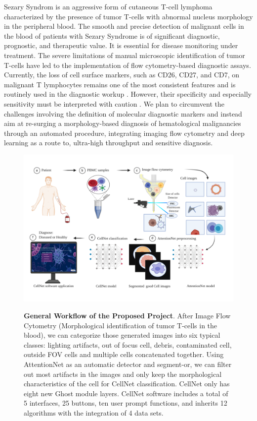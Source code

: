 Sezary Syndrom is an aggressive form of cutaneous T-cell lymphoma characterized by the presence of tumor T-cells with abnormal nucleus morphology in the peripheral blood. The smooth and precise detection of malignant cells in the blood of patients with Sezary Syndrome is of significant diagnostic, prognostic, and therapeutic value. It is essential for disease monitoring under treatment\cite{6}\cite{7}. The severe limitations of manual microscopic identification of tumor T-cells have led to the implementation of flow cytometry-based diagnostic assays. Currently, the loss of cell surface markers, such as CD26, CD27, and CD7, on malignant T lymphocytes remains one of the most consistent features and is routinely used in the diagnostic workup \cite{12}. However, their specificity and especially sensitivity must be interpreted with caution \cite{11}. We plan to circumvent the challenges involving the definition of molecular diagnostic markers and instead aim at re-surging a morphology-based diagnosis of hematological malignancies through an automated procedure, integrating imaging flow cytometry and deep learning as a route to, ultra-high throughput and sensitive diagnosis.
 
\label{sub:figures}
\begin{figure}[ht]
	\begin{center}
	\includegraphics[width=\textwidth]{thesis-template-master/images/general workflow2.pdf}
	\label{fig:lenna}
	\end{center}
	\caption{\textbf{General Workflow of the Proposed Project}. After Image Flow Cytometry (Morphological identification of tumor T-cells in the blood), we can categorize those generated images into six typical classes: lighting artifacts, out of focus cell, debris, contaminated cell, outside FOV cells and multiple cells concatenated together. Using AttentionNet as an automatic detector and segment-or, we can filter out most artifacts in the images and only keep the morphological characteristics of the cell for CellNet classification. CellNet only has eight new Ghost module layers. CellNet software includes a total of 5 interfaces, 25 buttons, ten user prompt functions, and inherits 12 algorithms with the integration of 4 data sets.}
	\label{fig:lennas}
\end{figure}



